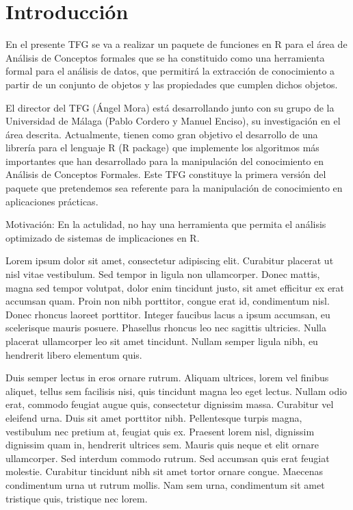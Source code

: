 \section{Introducci\'on}

En el presente TFG se va a realizar un paquete de funciones en 
R para el \'area de An\'alisis de Conceptos formales que se ha 
constituido como una herramienta formal para el an\'alisis de datos, 
que permitir\'a la extracci\'on de conocimiento a partir de un 
conjunto de objetos y las propiedades que cumplen dichos objetos.

El director del TFG (\'Angel Mora) est\'a desarrollando junto 
con su grupo de la Universidad de M\'alaga (Pablo Cordero y Manuel 
Enciso), su investigaci\'on en el \'area descrita. Actualmente, 
tienen como gran objetivo el desarrollo de una librer\'ia para el 
lenguaje R (R package) que implemente los algoritmos m\'as 
importantes que han desarrollado para la manipulaci\'on del 
conocimiento en An\'alisis de Conceptos Formales. Este TFG 
constituye la primera versi\'on del paquete que pretendemos sea 
referente para la manipulaci\'on de conocimiento en aplicaciones 
pr\'acticas.

Motivación:
En la actulidad, no hay una herramienta que permita el an\'alisis 
optimizado de sistemas de implicaciones en R.





Lorem ipsum dolor sit amet, consectetur adipiscing elit. Curabitur
placerat ut nisl vitae vestibulum. Sed tempor in ligula non ullamcorper.
Donec mattis, magna sed tempor volutpat, dolor enim tincidunt justo, 
sit amet efficitur ex erat accumsan quam. Proin non nibh porttitor, 
congue erat id, condimentum nisl. Donec rhoncus laoreet porttitor. 
Integer faucibus lacus a ipsum accumsan, eu scelerisque mauris posuere. 
Phasellus rhoncus leo nec sagittis ultricies. Nulla placerat ullamcorper 
leo sit amet tincidunt. Nullam semper ligula nibh, eu hendrerit 
libero elementum quis.

Duis semper lectus in eros ornare rutrum. Aliquam ultrices, lorem 
vel finibus aliquet, tellus sem facilisis nisi, quis tincidunt 
magna leo eget lectus. Nullam odio erat, commodo feugiat augue 
quis, consectetur dignissim massa. Curabitur vel eleifend urna. 
Duis sit amet porttitor nibh. Pellentesque turpis magna, vestibulum 
nec pretium at, feugiat quis ex. Praesent lorem nisl, dignissim 
dignissim quam in, hendrerit ultrices sem. Mauris quis neque et 
elit ornare ullamcorper. Sed interdum commodo rutrum. Sed accumsan 
quis erat feugiat molestie. Curabitur tincidunt nibh sit amet tortor
ornare congue. Maecenas condimentum urna ut rutrum mollis. Nam sem 
urna, condimentum sit amet tristique quis, tristique nec lorem.

